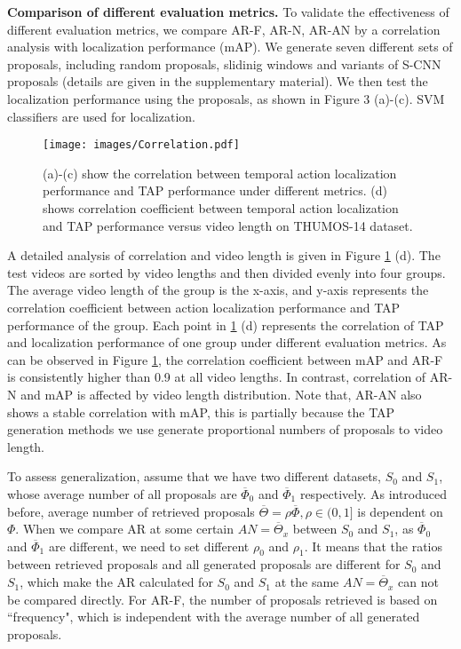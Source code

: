 \documentclass[10pt,twocolumn,letterpaper]{article}
\begin{document}
\textbf{Comparison of different evaluation metrics.} 
To validate the effectiveness of different evaluation metrics, we
compare AR-F, AR-N, AR-AN by a correlation analysis
with localization performance (mAP). We generate
seven different sets of proposals, including random
proposals, slidinig windows and variants of S-CNN \cite{Shou_2016_CVPR} proposals (details are given in the supplementary material).
We then test the localization performance using
the proposals, as shown in Figure 3 (a)-(c). SVM classifiers
are used for localization.






\begin{figure}[h]
  \centering
    \texttt{[image: images/Correlation.pdf]}
    \caption{(a)-(c) show the correlation between temporal action localization performance and TAP performance  under different metrics. (d) shows correlation coefficient between temporal action localization and TAP performance versus video length on THUMOS-14 dataset.}
      \label{fig:correlation}
\end{figure}

A detailed analysis of correlation and video length is given in Figure \ref{fig:correlation} (d). The test videos are sorted by video lengths and then divided evenly into four groups. The average video length of the group is the x-axis, and y-axis represents the correlation coefficient between action localization performance and TAP performance of the group. Each point in \ref{fig:correlation} (d) represents the correlation of TAP and localization performance of one group under different evaluation metrics. As can be observed in Figure \ref{fig:correlation}, the correlation coefficient between mAP and AR-F is consistently higher than 0.9 at all video lengths. In contrast, correlation of AR-N and mAP is affected by video length distribution. Note that, AR-AN also shows a stable correlation with mAP, this is partially because the TAP generation methods we use generate proportional numbers of proposals to video length. 
 
To assess generalization, assume that we have two different datasets, $S_0$ and $S_1$, whose average number of all proposals are $\overline{\Phi}_0$ and $\overline{\Phi}_1$ respectively. As introduced before, average number of retrieved proposals $\overline{\Theta} = \rho\overline{\Phi},  \rho\in(0,1]$ is dependent on $\Phi$. When we compare AR at some certain $AN=\overline{\Theta}_x$ between $S_0$ and $S_1$, as $\overline{\Phi}_0$ and $\overline{\Phi}_1$ are different, we need to set different $\rho_0$ and $\rho_1$. It means that the ratios between retrieved proposals and all generated proposals are different for $S_0$ and $S_1$, which make the AR calculated for $S_0$ and $S_1$ at the same $AN=\overline{\Theta}_x$ can not be compared directly. For AR-F, the number of proposals retrieved is based on ``frequency", which is independent with the average number of all generated proposals.
\end{document}
